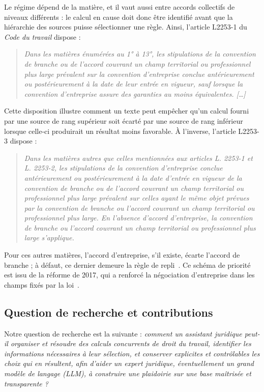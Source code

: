 Le régime dépend de la matière, et il vaut aussi entre accords collectifs de
niveaux différents : le calcul en cause doit donc être identifié avant que la
hiérarchie des sources puisse sélectionner une règle. Ainsi, l'article L2253-1
du \emph{Code du travail} dispose :
\begin{quote}\itshape
  Dans les matières énumérées au 1° à 13°, les stipulations de la convention de
  branche ou de l'accord couvrant un champ territorial ou professionnel plus
  large prévalent sur la convention d'entreprise conclue antérieurement ou
  postérieurement à la date de leur entrée en vigueur, sauf lorsque la
  convention d'entreprise assure des garanties au moins équivalentes. [\dots]
\end{quote}
Cette disposition illustre comment un texte peut empêcher qu'un calcul fourni
par une source de rang supérieur soit écarté par une source de rang inférieur
lorsque celle-ci produirait un résultat moins favorable. À l'inverse,
l'article L2253-3 dispose :
\begin{quote}\itshape
  Dans les matières autres que celles mentionnées aux articles L. 2253-1 et
  L. 2253-2, les stipulations de la convention d'entreprise conclue
  antérieurement ou postérieurement à la date d'entrée en vigueur de la
  convention de branche ou de l'accord couvrant un champ territorial ou
  professionnel plus large prévalent sur celles ayant le même objet prévues par
  la convention de branche ou l'accord couvrant un champ territorial ou
  professionnel plus large. En l'absence d'accord d'entreprise, la convention
  de branche ou l'accord couvrant un champ territorial ou professionnel plus
  large s'applique.
\end{quote}
Pour ces autres matières, l'accord d'entreprise, s'il existe, écarte l'accord
de branche ; à défaut, ce dernier demeure la règle de repli~\cite{frarticulation}.
Ce schéma de priorité est issu de la réforme de 2017, qui a renforcé la
négociation d'entreprise dans les champs fixés par la
loi~\cite{viepublique2017}.

\subsection{Question de recherche et contributions}\label{sec:question}
Notre question de recherche est la suivante : \emph{comment un assistant
juridique peut-il organiser et résoudre des calculs concurrents de droit du
travail, identifier les informations nécessaires à leur sélection, et conserver
explicites et contrôlables les choix qui en résultent, afin d'aider un expert
juridique, éventuellement un grand modèle de langage (LLM), à construire une
plaidoirie sur une base maîtrisée et transparente ?} 

